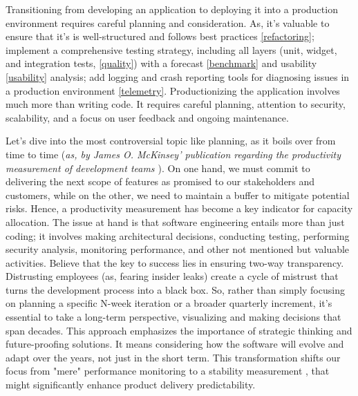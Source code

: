 

Transitioning from developing an application to deploying it into a production environment requires careful planning 
and consideration. As, it's valuable to ensure that it's is well-structured and follows best practices 
\ref{refactoring}; implement a comprehensive testing strategy, including all layers (unit, widget, and integration 
tests, \ref{quality}) with a forecast \ref{benchmark} and usability \ref{usability} analysis; add logging and crash 
reporting tools for diagnosing issues in a production environment \ref{telemetry}. Productionizing the application 
involves much more than writing code. It requires careful planning, attention to security, scalability, and a focus 
on user feedback and ongoing maintenance. 

Let's dive into the most controversial topic like planning, as it boils over from time to time (\emph{as, by James O. 
McKinsey' publication regarding the productivity measurement of development teams \cite{McKi23}}). On one hand, we 
must commit to delivering the next scope of features as promised to our stakeholders and customers, while on the other, 
we need to maintain a buffer to mitigate potential risks. Hence, a productivity measurement has become a key indicator 
for capacity allocation. The issue at hand is that software engineering entails more than just coding; it involves 
making architectural decisions, conducting testing, performing security analysis, monitoring performance, and other 
not mentioned but valuable activities. Believe that the key to success lies in ensuring two-way transparency. 
Distrusting employees (as, fearing insider leaks) create a cycle of mistrust that turns the development process into a 
black box. So, rather than simply focusing on planning a specific N-week iteration or a broader quarterly increment, 
it's essential to take a long-term perspective, visualizing and making decisions that span decades. This approach 
emphasizes the importance of strategic thinking and future-proofing solutions. It means considering how the software 
will evolve and adapt over the years, not just in the short term. This transformation shifts our focus from "mere" 
performance monitoring to a stability measurement \cite{Heal23}, that might significantly enhance product delivery 
predictability.
